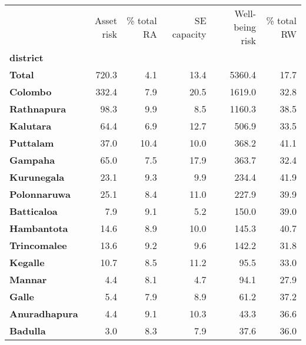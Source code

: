 \begin{tabular}{lrrrrr}
\toprule
{} &  Asset risk &  \% total RA &  SE capacity &  Well-being risk &  \% total RW \\
\textbf{district    } &             &             &              &                  &             \\
\midrule
\textbf{Total       } &       720.3 &         4.1 &         13.4 &           5360.4 &        17.7 \\
\textbf{Colombo     } &       332.4 &         7.9 &         20.5 &           1619.0 &        32.8 \\
\textbf{Rathnapura  } &        98.3 &         9.9 &          8.5 &           1160.3 &        38.5 \\
\textbf{Kalutara    } &        64.4 &         6.9 &         12.7 &            506.9 &        33.5 \\
\textbf{Puttalam    } &        37.0 &        10.4 &         10.0 &            368.2 &        41.1 \\
\textbf{Gampaha     } &        65.0 &         7.5 &         17.9 &            363.7 &        32.4 \\
\textbf{Kurunegala  } &        23.1 &         9.3 &          9.9 &            234.4 &        41.9 \\
\textbf{Polonnaruwa } &        25.1 &         8.4 &         11.0 &            227.9 &        39.9 \\
\textbf{Batticaloa  } &         7.9 &         9.1 &          5.2 &            150.0 &        39.0 \\
\textbf{Hambantota  } &        14.6 &         8.9 &         10.0 &            145.3 &        40.7 \\
\textbf{Trincomalee } &        13.6 &         9.2 &          9.6 &            142.2 &        31.8 \\
\textbf{Kegalle     } &        10.7 &         8.5 &         11.2 &             95.5 &        33.0 \\
\textbf{Mannar      } &         4.4 &         8.1 &          4.7 &             94.1 &        27.9 \\
\textbf{Galle       } &         5.4 &         7.9 &          8.9 &             61.2 &        37.2 \\
\textbf{Anuradhapura} &         4.4 &         9.1 &         10.3 &             43.3 &        36.6 \\
\textbf{Badulla     } &         3.0 &         8.3 &          7.9 &             37.6 &        36.0 \\

\end{tabular}
